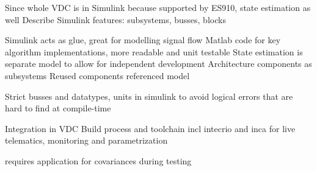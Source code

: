 Since whole VDC is in Simulink because supported by ES910, state estimation as well
Describe Simulink features: subsystems, busses, blocks

Simulink acts as glue, great for modelling signal flow
Matlab code for key algorithm implementations, more readable and unit testable
State estimation is separate model to allow for independent development
Architecture components as subsystems
Reused components referenced model

Strict busses and datatypes, units in simulink to avoid logical errors that are hard to find at compile-time

Integration in VDC
Build process and toolchain incl intecrio and inca for live telematics, monitoring and parametrization

requires application for covariances during testing

